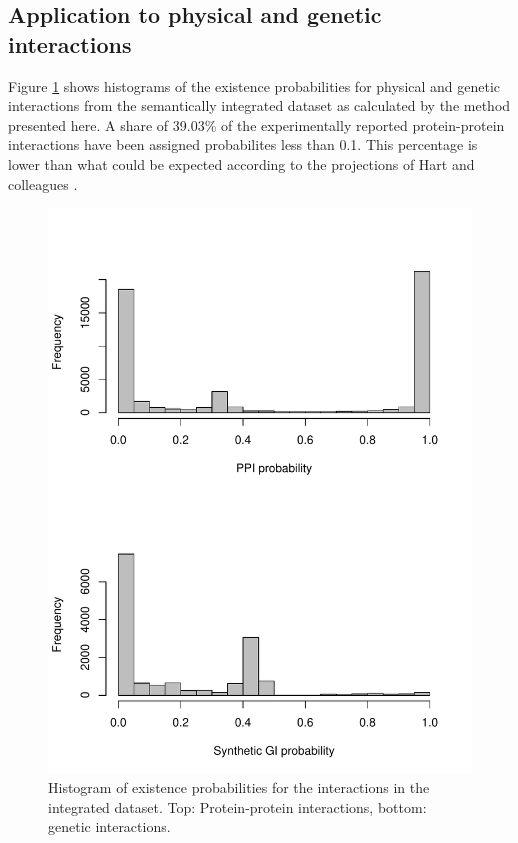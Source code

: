 \documentclass{bioinfo}
\newcommand{\note}[1]{{\color{red}[#1]}}
\begin{document}
\subsection{Application to physical and genetic interactions}

Figure \ref{ppi+gi} shows histograms of the existence probabilities for physical and genetic interactions from the semantically integrated dataset as calculated by the method presented here. A share of 39.03\% of the experimentally reported protein-protein interactions have been assigned probabilites less than 0.1. This percentage is lower than what could be expected according to the projections of Hart and colleagues \citep{hart_how_2006}.


\begin{figure}[!tpb]
\centerline{\includegraphics[width=.5\textwidth]{fig2.pdf}}
\caption{Histogram of existence probabilities for the interactions in the integrated dataset. Top: Protein-protein interactions, bottom: genetic interactions.}
\label{ppi+gi}
\end{figure}

\end{document}
